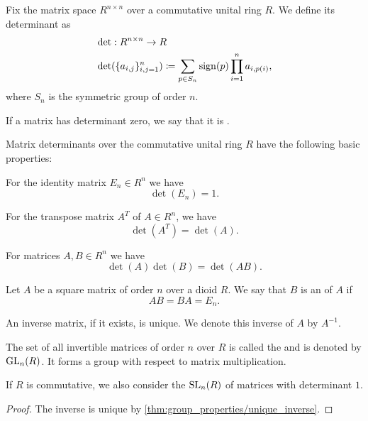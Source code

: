 \begin{definition}\label{def:matrix_determinant}\cite[215]{Knapp2016BAlg}
  Fix the matrix space \( R^{n \times n} \) over a commutative unital ring \( R \). We define its determinant as
  \begin{align*}
    &\det: R^{n \times n} \to R \\
    &\det(\{ a_{i,j} \}_{i,j=1}^n) \coloneqq \sum_{p \in S_n} \operatorname{sign}(p) \prod_{i=1}^n a_{i,p(i)},
  \end{align*}
  where \( S_n \) is the symmetric group of order \( n \).

  If a matrix has determinant zero, we say that it is .
\end{definition}

\begin{proposition}\label{def:matrix_determinant_properties}\cite[proposition 5.1]{Knapp2016BAlg}
  Matrix determinants over the commutative unital ring \( R \) have the following basic properties:
  \begin{thmenum}
     For the identity matrix \( E_n \in R^n \) we have
    \begin{equation*}
      \det(E_n) = 1.
    \end{equation*}

     For the transpose matrix \( A^T \) of \( A \in R^n \), we have
    \begin{equation*}
      \det(A^T) = \det(A).
    \end{equation*}

     For matrices \( A, B \in R^n \) we have
    \begin{equation*}
      \det(A) \det(B) = \det(AB).
    \end{equation*}
  \end{thmenum}
\end{proposition}

\begin{definition}\label{def:inverse_matrix}
  Let \( A \) be a square matrix of order \( n \) over a dioid \( R \). We say that \( B \) is an  of \( A \) if
  \begin{equation*}
    AB = BA = E_n.
  \end{equation*}

  An inverse matrix, if it exists, is unique. We denote this inverse of \( A \) by \( A^{-1} \).

  The set of all invertible matrices of order \( n \) over \( R \) is called the  and is denoted by \( \operatorname{GL}_n(R) \). It forms a group with respect to matrix multiplication.

  If \( R \) is commutative, we also consider the  \( \operatorname{SL}_n(R) \) of matrices with determinant \( 1 \).
\end{definition}
\begin{proof}
  The inverse is unique by \cref{thm:group_properties/unique_inverse}.
\end{proof}

